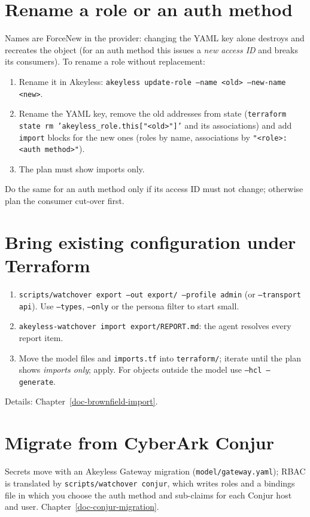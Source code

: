 \section{Rename a role or an auth method}
Names are ForceNew in the provider: changing the YAML key alone destroys and recreates the object
(for an auth method this issues a \emph{new access ID} and breaks its consumers). To rename a role
without replacement:
\begin{enumerate}
\item Rename it in Akeyless: \texttt{akeyless update-role --name <old> --new-name <new>}.
\item Rename the YAML key, remove the old addresses from state
  (\texttt{terraform state rm 'akeyless\_role.this["<old>"]'} and its associations) and add
  \texttt{import} blocks for the new ones (roles by name, associations by \texttt{"<role>:<auth method>"}).
\item The plan must show imports only.
\end{enumerate}
Do the same for an auth method only if its access ID must not change; otherwise plan the consumer
cut-over first.

\section{Bring existing configuration under Terraform}
\begin{enumerate}
\item \texttt{scripts/watchover export --out export/ --profile admin} (or \texttt{--transport api}).
  Use \texttt{--types}, \texttt{--only} or the persona filter to start small.
\item \texttt{akeyless-watchover import export/REPORT.md}: the agent resolves every report item.
\item Move the model files and \texttt{imports.tf} into \texttt{terraform/}; iterate until the plan
  shows \emph{imports only}; apply. For objects outside the model use \texttt{--hcl --generate}.
\end{enumerate}
Details: Chapter~\ref{doc-brownfield-import}.

\section{Migrate from CyberArk Conjur}
Secrets move with an Akeyless Gateway migration (\texttt{model/gateway.yaml}); RBAC is translated
by \texttt{scripts/watchover conjur}, which writes roles and a bindings file in which you choose the
auth method and sub-claims for each Conjur host and user. Chapter~\ref{doc-conjur-migration}.

